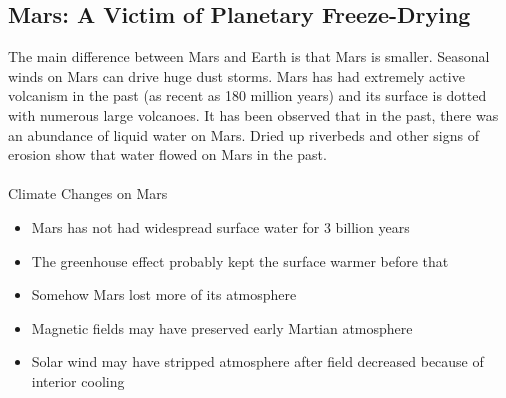\documentclass[12pt]{article}
\begin{document}
\subsection{Mars: A Victim of Planetary Freeze-Drying} 
The main difference between Mars and Earth is that Mars is smaller. Seasonal winds on Mars can drive huge dust storms. Mars has had extremely active volcanism in the past (as recent as 180 million years) and its surface is dotted with numerous large volcanoes. It has been observed that in the past, there was an abundance of liquid water on Mars. Dried up riverbeds and other signs of erosion show that water flowed on Mars in the past. \\~\\
Climate Changes on Mars \begin{itemize} 
\item Mars has not had widespread surface water for  3 billion years 
\item The greenhouse effect probably kept the surface warmer before that 
\item Somehow Mars lost more of its atmosphere 
\item Magnetic fields may have preserved early Martian atmosphere
\item Solar wind may have stripped atmosphere after field decreased because of interior cooling
\end{itemize}
\end{document}
